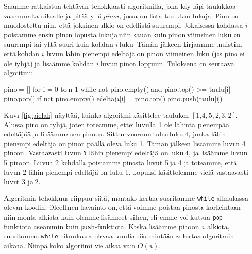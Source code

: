Saamme ratkaistua tehtävän tehokkaasti algoritmilla,
joka käy läpi taulukkoa vasemmalta oikealle ja pitää yllä \emph{pinoa},
jossa on lista taulukon lukuja.
Pino on muodostettu niin, että jokainen alkio on edellistä suurempi.
Jokaisessa kohdassa $i$ poistamme ensin pinon lopusta lukuja
niin kauan kuin pinon viimeinen luku on suurempi tai yhtä
suuri kuin kohdan $i$ luku.
Tämän jälkeen kirjaamme muistiin, että kohdan $i$ luvun
lähin pienempi edeltäjä on pinon viimeinen luku (jos pino ei ole tyhjä) ja
lisäämme kohdan $i$ luvun pinon loppuun.
Tuloksena on seuraava algoritmi:

\begin{code}
pino = []
for i = 0 to n-1
    while not pino.empty() and pino.top() >= taulu[i]
        pino.pop()
    if not pino.empty()
        edeltaja[i] = pino.top()
    pino.push(taulu[i])
\end{code}

Kuva \ref{fig:pielah} näyttää, kuinka algoritmi käsittelee taulukon $[1,4,5,2,3,2]$.
Alussa pino on tyhjä, joten toteamme, ettei luvulla 1
ole lähintä pienempää edeltäjää ja lisäämme sen pinoon.
Sitten vuoroon tulee luku 4, jonka lähin pienempi edeltäjä
on pinon päällä oleva luku 1. Tämän jälkeen lisäämme luvun 4 pinoon.
Vastaavasti luvun 5 lähin pienempi edeltäjä on luku 4,
ja lisäämme luvun 5 pinoon.
Luvun 2 kohdalla poistamme pinosta luvut 5 ja 4
ja toteamme, että luvun 2 lähin pienempi edeltäjä on luku 1.
Lopuksi käsittelemme vielä vastaavasti luvut 3 ja 2.

Algoritmin tehokkuus riippuu siitä, montako kertaa suoritamme
\texttt{while}-silmukassa olevan koodin.
Oleellinen havainto on, että voimme poistaa pinosta
korkeintaan niin monta alkiota kuin olemme lisänneet siihen,
eli emme voi kutsua \texttt{pop}-funktiota useammin kuin \texttt{push}-funktiota.
Koska lisäämme pinoon $n$ alkiota, suoritamme \texttt{while}-silmukassa
olevaa koodia siis enintään $n$ kertaa algoritmin aikana.
Niinpä koko algoritmi vie aikaa vain $O(n)$.
